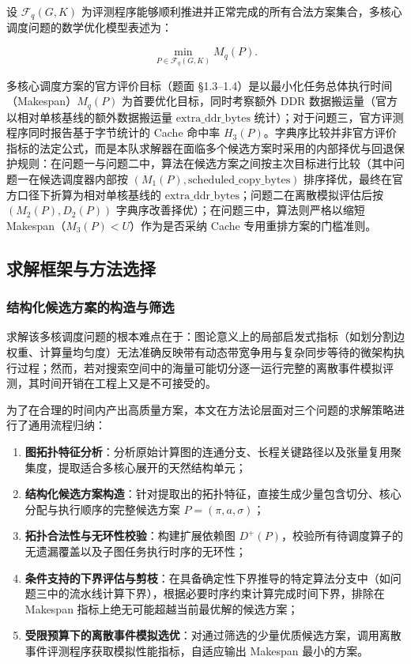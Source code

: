 \documentclass[anonymous,withtoc]{gmcm2026}
\providecommand{\tightlist}{\setlength{\itemsep}{0pt}\setlength{\parskip}{0pt}}
\begin{document}
设 \(\mathcal{F}_q(G, K)\) 为评测程序能够顺利推进并正常完成的所有合法方案集合，多核心调度问题的数学优化模型表述为：

\begin{equation}
\min_{P \in \mathcal{F}_q(G, K)} M_q(P).
\end{equation}

多核心调度方案的官方评价目标（题面 §1.3--1.4）是以最小化任务总体执行时间（Makespan）\(M_q(P)\) 为首要优化目标，同时考察额外 DDR 数据搬运量（官方以相对单核基线的额外数据搬运量 \(\text{extra\_ddr\_bytes}\) 统计）；对于问题三，官方评测程序同时报告基于字节统计的 Cache 命中率 \(H_3(P)\)。字典序比较并非官方评价指标的法定公式，而是本队求解器在面临多个候选方案时采用的内部择优与回退保护规则：在问题一与问题二中，算法在候选方案之间按主次目标进行比较（其中问题一在候选调度器内部按 \((M_1(P), \text{scheduled\_copy\_bytes})\) 排序择优，最终在官方口径下折算为相对单核基线的 \(\text{extra\_ddr\_bytes}\)；问题二在离散模拟评估后按 \((M_2(P), D_2(P))\) 字典序改善择优）；在问题三中，算法则严格以缩短 Makespan（\(M_3(P) < U\)）作为是否采纳 Cache 专用重排方案的门槛准则。

\subsection{求解框架与方法选择}

\subsubsection{结构化候选方案的构造与筛选}

求解该多核调度问题的根本难点在于：图论意义上的局部启发式指标（如划分割边权重、计算量均匀度）无法准确反映带有动态带宽争用与复杂同步等待的微架构执行过程；然而，若对搜索空间中的海量可能切分逐一运行完整的离散事件模拟评测，其时间开销在工程上又是不可接受的。

为了在合理的时间内产出高质量方案，本文在方法论层面对三个问题的求解策略进行了通用流程归纳：

\begin{enumerate}
\def\labelenumi{\arabic{enumi}.}
\tightlist
\item
  \textbf{图拓扑特征分析}：分析原始计算图的连通分支、长程关键路径以及张量复用聚集度，提取适合多核心展开的天然结构单元；
\item
  \textbf{结构化候选方案构造}：针对提取出的拓扑特征，直接生成少量包含切分、核心分配与执行顺序的完整候选方案 \(P = (\pi, a, \sigma)\)；
\item
  \textbf{拓扑合法性与无环性校验}：构建扩展依赖图 \(D^+(P)\)，校验所有待调度算子的无遗漏覆盖以及子图任务执行时序的无环性；
\item
  \textbf{条件支持的下界评估与剪枝}：在具备确定性下界推导的特定算法分支中（如问题三中的流水线计算下界），根据必要时序约束计算完成时间下界，排除在 Makespan 指标上绝无可能超越当前最优解的候选方案；
\item
  \textbf{受限预算下的离散事件模拟选优}：对通过筛选的少量优质候选方案，调用离散事件评测程序获取模拟性能指标，自适应输出 Makespan 最小的方案。
\end{enumerate}
\end{document}
